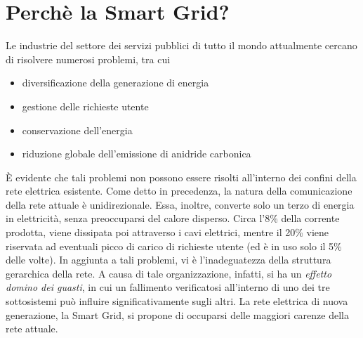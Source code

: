 \section{Perchè la Smart Grid?}
Le industrie del settore dei servizi pubblici di tutto il mondo attualmente cercano di risolvere numerosi problemi, tra cui 
\begin{itemize}
\item diversificazione della generazione di energia
\item gestione delle richieste utente
\item conservazione dell'energia
\item riduzione globale dell'emissione di anidride carbonica
\end{itemize}
È evidente che tali problemi non possono essere risolti all'interno dei confini della rete elettrica esistente. \newline
Come detto in precedenza, la natura della comunicazione della rete attuale è unidirezionale. Essa, inoltre, converte solo un terzo di energia in elettricità, senza preoccuparsi del calore disperso. Circa l'8\% della corrente prodotta, viene dissipata poi attraverso i cavi elettrici, mentre il 20\% viene riservata ad eventuali picco di carico di richieste utente (ed è in uso solo il 5\% delle volte). \newline
In aggiunta a tali problemi, vi è l'inadeguatezza della struttura gerarchica della rete. A causa di tale organizzazione, infatti, si ha un \textit{effetto domino dei guasti}, in cui un fallimento verificatosi all'interno di uno dei tre sottosistemi può influire significativamente sugli altri. \newline
La rete elettrica di nuova generazione, la Smart Grid, si propone di occuparsi delle maggiori carenze della rete attuale.
\begin{figure}[h]
\end{figure}

